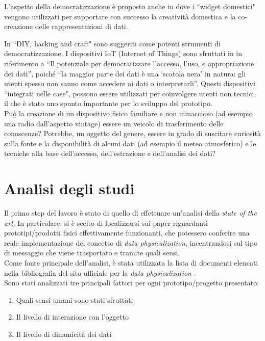 \documentclass[12pt,a4paper]{report}
\begin{document}
L'aspetto della democratizzazione è proposto anche in \cite{verweij2019domestic} dove i ``widget domestici" vengono utilizzati per supportare con successo la creatività domestica e la co-creazione delle rappresentazioni di dati.

In \cite{tanenbaum2013democratizing} ``DIY, hacking and craft" sono suggeriti come potenti strumenti di democratizzazione. I dispositivi IoT (Internet of Things) sono sfruttati in \cite{houben2016physikit} in riferimento a ``Il potenziale per democratizzare l'accesso, l'uso, e appropriazione dei dati'', poiché ``la maggior parte dei dati è una `scatola nera' in natura: gli utenti spesso non sanno come accedere ai dati o interpretarli''. Questi dispositivi ``integrati nelle case", possono essere utilizzati per coinvolgere utenti non tecnici, il che è stato uno spunto importante per lo sviluppo del prototipo.\\

Può la creazione di un dispositivo fisico familiare e non minaccioso (ad esempio una radio dall'aspetto vintage) essere un veicolo di trasferimento delle conoscenze? Potrebbe, un oggetto del genere, essere in grado di suscitare curiosità sulla fonte e la disponibilità di alcuni dati (ad esempio il meteo atmosferico) e le tecniche alla base dell'accesso, dell'estrazione e dell'analisi dei dati?


\section{Analisi degli studi}\label{sec:analisistudi}

Il primo step del lavoro è stato di quello di effettuare un'analisi della \textit{state of the art}. %
In particolare, si è scelto di focalizzarsi sui paper riguardanti prototipi/prodotti fisici effettivamente funzionanti, che potessero conferire una reale implementazione del concetto di \textit{data physicalization}, incentrandosi sul tipo di messaggio che viene trasportato e tramite quali sensi.\\
Come fonte principale dell'analisi, è stata utilizzata la lista di documenti elencati nella bibliografia del sito ufficiale per la \textit{data physicalization} \cite{dataphys_org_bib}.\\
Sono stati analizzati tre principali fattori per ogni prototipo/progetto presentato:
\begin{enumerate}
	\item Quali sensi umani sono stati sfruttati
	\item Il livello di interazione con l'oggetto
	\item Il livello di dinamicità dei dati
\end{enumerate}
\end{document}

